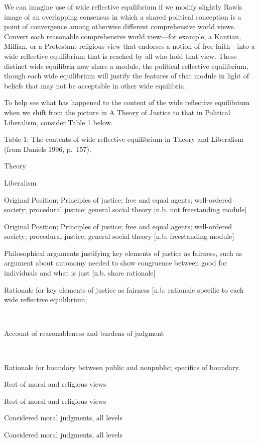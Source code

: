 \documentclass[]{article}
\begin{document}
We can imagine use of wide reflective equilibrium if we modify slightly
Rawls image of an overlapping consensus in which a shared political
conception is a point of convergence among otherwise different
comprehensive world views. Convert each reasonable comprehensive world
view---for example, a Kantian, Millian, or a Protestant religious view
that endorses a notion of free faith---into a wide reflective
equilibrium that is reached by all who hold that view. These distinct
wide equilibria now share a module, the political reflective
equilibrium, though each wide equilibrium will justify the features of
that module in light of beliefs that may not be acceptable in other wide
equilibria.

To help see what has happened to the content of the wide reflective
equilibrium when we shift from the picture in A Theory of Justice to
that in Political Liberalism, consider Table 1 below.

Table 1: The contents of wide reflective equilibrium in Theory and
Liberalism (from Daniels 1996, p.~157).

Theory

Liberalism

Original Position; Principles of justice; free and equal agents;
well-ordered society; procedural justice; general social theory {[}n.b.
not freestanding module{]}

Original Position; Principles of justice; free and equal agents;
well-ordered society; procedural justice; general social theory {[}n.b.
freestanding module{]}

Philosophical arguments justifying key elements of justice as fairness,
such as argument about autonomy needed to show congruence between good
for individuals and what is just {[}n.b. share rationale{]}

Rationale for key elements of justice as fairness {[}n.b. rationale
specific to each wide reflective equilibrium{]}

~

Account of reasonableness and burdens of judgment

~

Rationale for boundary between public and nonpublic; specifics of
boundary.

Rest of moral and religious views

Rest of moral and religious views

Considered moral judgments, all levels

Considered moral judgments, all levels
\end{document}

